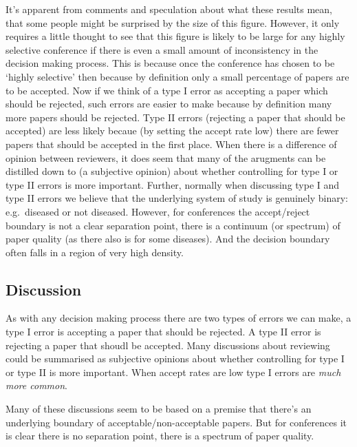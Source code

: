 \documentclass[a4paperpaper,]{article}
\begin{document}
It's apparent from comments and speculation about what these results
mean, that some people might be surprised by the size of this figure.
However, it only requires a little thought to see that this figure is
likely to be large for any highly selective conference if there is even
a small amount of inconsistency in the decision making process. This is
because once the conference has chosen to be `highly selective' then
because by definition only a small percentage of papers are to be
accepted. Now if we think of a type I error as accepting a paper which
should be rejected, such errors are easier to make because by definition
many more papers should be rejected. Type II errors (rejecting a paper
that should be accepted) are less likely becaue (by setting the accept
rate low) there are fewer papers that should be accepted in the first
place. When there is a difference of opinion between reviewers, it does
seem that many of the arugments can be distilled down to (a subjective
opinion) about whether controlling for type I or type II errors is more
important. Further, normally when discussing type I and type II errors
we believe that the underlying system of study is genuinely binary:
e.g.~diseased or not diseased. However, for conferences the
accept/reject boundary is not a clear separation point, there is a
continuum (or spectrum) of paper quality (as there also is for some
diseases). And the decision boundary often falls in a region of very
high density.

\hypertarget{discussion}{%
\subsection{Discussion}\label{discussion}}

\begin{flushright}
\end{flushright}

As with any decision making process there are two types of errors we can
make, a type I error is accepting a paper that should be rejected. A
type II error is rejecting a paper that shoudl be accepted. Many
discussions about reviewing could be summarised as subjective opinions
about whether controlling for type I or type II is more important. When
accept rates are low type I errors are \emph{much more common}.

Many of these discussions seem to be based on a premise that there's an
underlying boundary of acceptable/non-acceptable papers. But for
conferences it is clear there is no separation point, there is a
spectrum of paper quality.
\end{document}
